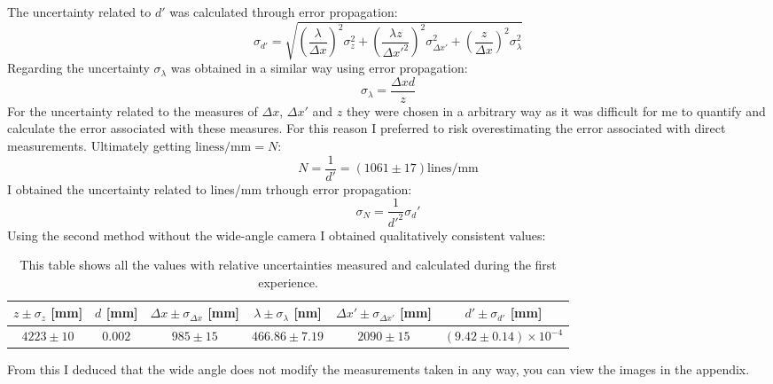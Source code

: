 The uncertainty related to $ d '$ was calculated through error propagation:
\begin{equation}
    \sigma_{d'}=\sqrt{\left(\frac{\lambda}{\Delta x}\right)^2\sigma_z^2+\left(\frac{\lambda z}{\Delta x'^2}\right)^2\sigma_{\Delta x'}^2+\left(\frac{z}{\Delta x}\right)^2\sigma_\lambda^2}
    \label{incertezza}
\end{equation}
Regarding the uncertainty $ \sigma_\lambda $ was obtained in a similar way using error propagation:
\begin{equation}
    \sigma_\lambda=\frac{\Delta x d}{z}
\end{equation}
For the uncertainty related to the measures of $ \Delta x $, $ \Delta x '$ and $ z $ they were chosen in a arbitrary way as it was difficult for me to quantify and calculate the error associated with these measures. For this reason I preferred to risk overestimating the error associated with direct measurements.
Ultimately getting $\text{liness/mm}=N$:
\begin{equation*}
    N=\frac{1}{d'}=(1061\pm17) \text{lines/mm}
\end{equation*}
I obtained the uncertainty related to lines/mm trhough error propagation:
\begin{equation}
    \sigma_N=\frac{1}{d'^2}\sigma_d'
\end{equation}
Using the second method without the wide-angle camera I obtained qualitatively consistent values:
\begin{table}[ht!]
    \begin{tabular}{|c|c|c|c|c|c|}
    \hline
     $z\pm\sigma_z$ [mm] & $d$ [mm] & $\Delta x\pm\sigma_{\Delta x}$ [mm] & $\lambda\pm\sigma_\lambda$ [nm] & $\Delta x' \pm \sigma_{\Delta x'}$ [mm] & $d'\pm\sigma_{d'}$ [mm] \\
    \hline
    $4223\pm10$ & $0.002$ & $985\pm15$ & $466.86\pm7.19$ & $2090\pm15$ & $(9.42\pm0.14)\times10^{-4}$ \\
    \hline
    \end{tabular}
    \caption{This table shows all the values with relative uncertainties measured and calculated during the first experience.}
\end{table}

From this I deduced that the wide angle does not modify the measurements taken in any way, you can view the images in the appendix.
\newpage
